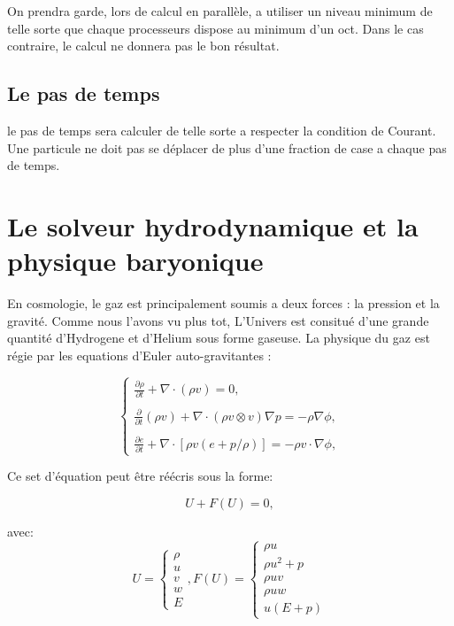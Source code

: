 On prendra garde, lors de calcul en parallèle, a utiliser un niveau minimum de telle sorte que chaque processeurs dispose au minimum d'un oct.
Dans le cas contraire, le calcul ne donnera pas le bon résultat.

\subsection{Le pas de temps}

le pas de temps sera calculer de telle sorte a respecter la condition de Courant.
Une particule ne doit pas se déplacer de plus d'une fraction de case a chaque pas de temps.


\section{Le solveur hydrodynamique et la physique baryonique}



En cosmologie, le gaz est principalement soumis a deux forces : la pression et la gravité.
Comme nous l'avons vu plus tot, L'Univers est consitué d'une grande quantité d'Hydrogene et d'Helium sous forme gaseuse.
La physique du gaz est régie par les equations d'Euler auto-gravitantes :

\begin{equation}
\begin{cases}

{ \frac{ \partial \rho }{ \partial t } + \nabla \cdot (\rho v) = 0}, \\
\\
{ \frac{ \partial }{ \partial t } (\rho v) + \nabla \cdot (\rho v \otimes v ) \nabla p = -\rho\nabla \phi }, \\
\\
{ \frac{ \partial e }{ \partial t } + \nabla \cdot [ \rho v (e+p/\rho) ] = -\rho v \cdot \nabla \phi },

\end{cases}
\end{equation}
\label{eq:hydro}

Ce set d'équation peut être réécris sous la forme:

\begin{equation}
U+F(U) = 0,
\end{equation}

avec:
\begin{equation}
U=
\begin{cases}
{ \rho}\\
{ u}\\
{ v}\\
{ w}\\
{ E}
\end{cases}
,
F(U)=
\begin{cases}
{ \rho u}\\
{ \rho u^2+p}\\
{ \rho uv}\\
{ \rho uw}\\
{ u(E+p)}
\end{cases}
\end{equation}

